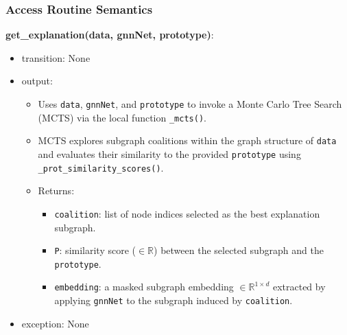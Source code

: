 \documentclass[12pt, titlepage]{article}
\begin{document}
\subsubsection{Access Routine Semantics}

\noindent \textbf{get\_explanation(data, gnnNet, prototype)}:
\begin{itemize}
  \item transition: None
  \item output:
  \begin{itemize}
    \item Uses \texttt{data}, \texttt{gnnNet}, and \texttt{prototype} to invoke a Monte Carlo Tree Search (MCTS) via the local function \texttt{\_mcts()}.
    \item MCTS explores subgraph coalitions within the graph structure of \texttt{data} and evaluates their similarity to the provided \texttt{prototype} using \texttt{\_prot\_similarity\_scores()}.
    \item Returns:
    \begin{itemize}
      \item \texttt{coalition}: list of node indices selected as the best explanation subgraph.
      \item \texttt{P}: similarity score (\(\in \mathbb{R}\)) between the selected subgraph and the \texttt{prototype}.
      \item \texttt{embedding}: a masked subgraph embedding \(\in \mathbb{R}^{1 \times d}\) extracted by applying \texttt{gnnNet} to the subgraph induced by \texttt{coalition}.
    \end{itemize}
  \end{itemize}
  \item exception: None
\end{itemize}
\end{document}
